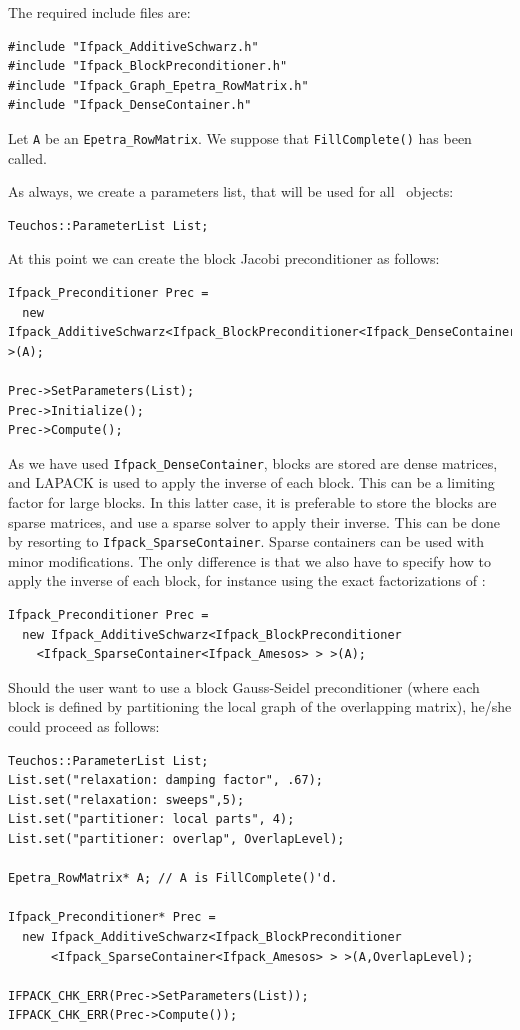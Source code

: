 The required include files are:
\begin{verbatim}
#include "Ifpack_AdditiveSchwarz.h"
#include "Ifpack_BlockPreconditioner.h"
#include "Ifpack_Graph_Epetra_RowMatrix.h"
#include "Ifpack_DenseContainer.h"
\end{verbatim}

Let \verb!A! be an \verb!Epetra_RowMatrix!. We suppose that
\verb!FillComplete()! has been called. 

As always, we create a parameters list, that will be used
for all \ifpack\ objects:
\begin{verbatim}
Teuchos::ParameterList List;
\end{verbatim}
At this point we can create the block Jacobi preconditioner as follows:
\begin{verbatim}
Ifpack_Preconditioner Prec = 
  new Ifpack_AdditiveSchwarz<Ifpack_BlockPreconditioner<Ifpack_DenseContainer> >(A);

Prec->SetParameters(List);
Prec->Initialize();
Prec->Compute();
\end{verbatim}
As we have used {\tt Ifpack\_DenseContainer}, blocks are stored are dense
matrices, and LAPACK is used to apply the inverse of each block. This can be a
limiting factor for large blocks. In this latter case, it is preferable to
store the blocks are sparse matrices, and use a sparse solver to apply their
inverse. This can be done by resorting to {\tt Ifpack\_SparseContainer}. 
Sparse containers can be used with minor modifications. The only difference is
that we also have to specify how to apply the inverse of each block, for
instance using the exact factorizations of \amesos:
\begin{verbatim}
Ifpack_Preconditioner Prec = 
  new Ifpack_AdditiveSchwarz<Ifpack_BlockPreconditioner
    <Ifpack_SparseContainer<Ifpack_Amesos> > >(A);
\end{verbatim}

Should the user want to use a block Gauss-Seidel preconditioner (where each
block is defined by partitioning the local graph of the overlapping matrix),
he/she could proceed as follows:
\begin{verbatim}
Teuchos::ParameterList List;
List.set("relaxation: damping factor", .67);
List.set("relaxation: sweeps",5);
List.set("partitioner: local parts", 4);
List.set("partitioner: overlap", OverlapLevel);

Epetra_RowMatrix* A; // A is FillComplete()'d.

Ifpack_Preconditioner* Prec =
  new Ifpack_AdditiveSchwarz<Ifpack_BlockPreconditioner
      <Ifpack_SparseContainer<Ifpack_Amesos> > >(A,OverlapLevel);

IFPACK_CHK_ERR(Prec->SetParameters(List));
IFPACK_CHK_ERR(Prec->Compute());
\end{verbatim}

